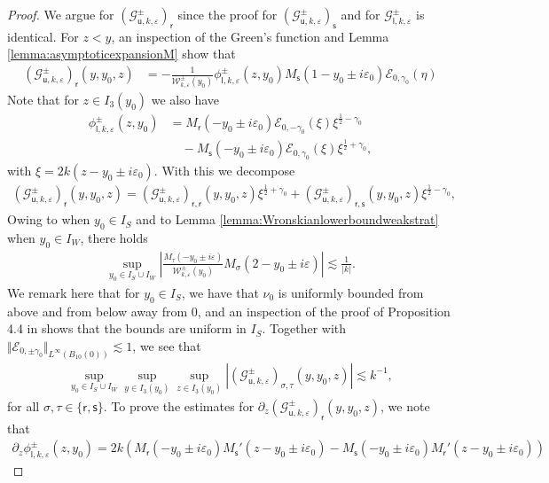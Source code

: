 \documentclass[11pt,reqno]{amsproc}
\theoremstyle{definition}
\numberwithin{equation}{section}
\newcommand{\G}{{\mathcal{G}}}
\newcommand{\sr}{{\mathsf{r}}}
\newcommand{\s}{{\mathsf{s}}}
\newcommand{\su}{{\mathsf{u}}}
\renewcommand{\sl}{{\mathsf{l}}}
\newcommand{\W}{{\mathcal{W}}}
\newcommand{\ep}{\varepsilon}
\begin{document}
\begin{proof}
We argue for $\left( \G_{\su,k,\ep}^\pm\right)_\sr$ since the proof for $\left( \G_{\su, k,\ep}^\pm\right)_\s$ and for $\G_{\sl,k,\ep}^\pm$ is identical. For $z< y$, an inspection of the Green's function and Lemma \ref{lemma:asymptoticexpansionM} show that
\begin{align*}
\left( \G_{\su,k,\ep}^\pm\right)_\sr(y,y_0,z) &= -\frac{1}{\W_{k,\ep}^\pm(y_0)}\phi_{\sl,k,\ep}^\pm(z,y_0)M_\s(1 - y_0 \pm i\ep_0) \mathcal{E}_{0,\gamma_0}(\eta)
\end{align*}
Note that for $z\in I_3(y_0)$ we also have
\begin{align*}
\phi_{\sl,k,\ep}^\pm(z,y_0) &= M_\sr( - y_0\pm i\ep_0)\mathcal{E}_{0,-\gamma_0}(\xi)  \xi^{\frac12-\gamma_0} \\
&\quad- M_\s( - y_0\pm i\ep_0)\mathcal{E}_{0,\gamma_0}(\xi) \xi^{\frac12+\gamma_0},
\end{align*}
with $\xi=2k(z-y_0\pm i\ep_0)$. With this we decompose 
\begin{align*}
\left( \G_{\su,k,\ep}^\pm\right)_\sr(y,y_0,z) = \left( \G_{\su, k,\ep}^\pm\right)_{\sr,\sr}(y,y_0,z)\xi^{\frac12+\gamma_0} + \left( \G_{\su, k,\ep}^\pm\right)_{\sr,\s}(y,y_0,z)\xi^{\frac12-\gamma_0},
\end{align*}
Owing to \cite[Proposition 4.4]{CZN25chan} when $y_0\in I_S$ and to Lemma \ref{lemma:Wronskianlowerboundweakstrat} when $y_0\in I_W$, there holds
\begin{align*}
\sup_{y_0\in I_S\cup I_W } \left| \frac{M_\tau( - y_0 \pm i \ep)}{\W_{k,\ep}^\pm (y_0)} M_\sigma(2 - y_0 \pm i \ep)\right| \lesssim \frac{1}{|k|}.
\end{align*}
We remark here that for $y_0\in I_S$, we have that $\nu_0$ is uniformly bounded from above and from below away from 0, and an inspection of the proof of Proposition 4.4 in \cite{CZN25chan} shows that the bounds are uniform in $I_S$.  Together with $\Vert \mathcal{E}_{0,\pm \gamma_0}\Vert_{L^\infty(B_{10}(0))}\lesssim 1$,  we see that
\begin{align*}
\sup_{y_0\in I_S\cup I_W} \sup_{y\in I_3(y_0)} \sup_{z\in I_3(y_0)} \left| \left( \G_{\su, k,\ep}^\pm\right)_{\sigma,\tau}(y,y_0,z) \right| \lesssim k^{-1},
\end{align*}
for all $\sigma,\tau \in \lbrace \sr, \s \rbrace$. To prove the estimates for $\partial_z\left( \G_{\su, k,\ep}^\pm\right)_\sr(y,y_0,z)$, we note that 
\begin{align*}
\partial_z\phi_{\sl,k,\ep}^\pm(z,y_0) = 2k \left( M_\sr( - y_0\pm i\ep_0)M_\s'(z- y_0\pm i\ep_0) - M_\s( - y_0\pm i\ep_0)M_\sr'(z-y_0\pm i\ep_0) \right)

\end{align*}
\end{proof}
\end{document}
